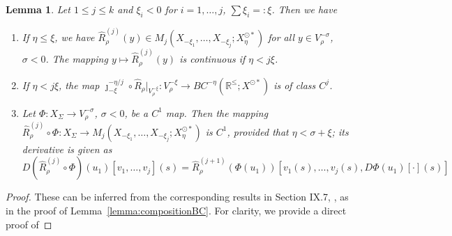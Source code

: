 \documentclass[a4paper, 12pt, oneside, reqno, notitlepage]{amsart}
\theoremstyle{plain}
\newtheorem{lemma}[theorem]{Lemma}
\theoremstyle{definition}
\theoremstyle{remark}
\begin{document}
\begin{lemma}\label{lemma:wideR} 
    Let $1 \leq j \leq k$ and $\xi_i < 0$ for $i =1,\ldots,j$, $\sum \xi_i = : \xi$. 
    Then we have
    \begin{enumerate}[label=\upshape{(\roman*)}]
        \item \label{wideR1} If $\eta \leq  \xi $, we have $\widehat{R}_\rho^{(j)}(y) \in M_j(X_{-\xi_1},\ldots,X_{-\xi_j};X^{\odot *}_{\eta})$ for all $y \in V^{-\sigma}_\rho$, $\sigma < 0$. The mapping $y \mapsto \widehat{R}_\rho^{(j)}(y)$ is continuous if $\eta < j \xi$.
        \item \label{wideR2} If $\eta < j \xi$, the map $\jmath_{-\xi}^{-\eta/j} \circ \widehat{R}_\rho|_{V_\rho^{-\xi}}: V_\rho^{-\xi} \to BC^{-\eta}(\mathbb{R}^{\leq};X^{\odot *})$ is of class $C^j$.
        \item \label{wideR3} Let $\Phi:X_\Sigma \to V_\rho^{-\sigma}$, $\sigma < 0$, be a $C^1$ map. Then the mapping $\widehat{R}_\rho^{(j)} \circ \Phi:X_\Sigma \to M_j(X_{-\xi_1},\ldots,X_{-\xi_j};X^{\odot *}_{\eta})$ is $C^1$, provided that $\eta < \sigma +  \xi$; its derivative is given as
        \begin{equation}
            D (\widehat{R}_\rho^{(j)} \circ \Phi)(u_1) [v_1,\ldots,v_j] (s)=  \widehat{R}_\rho^{(j+1)}(\Phi(u_1))[ v_1(s),\ldots,v_j(s),D\Phi(u_1) [\cdot ](s)]
            \label{eq:Rhatcompderiv}
        \end{equation}
    \end{enumerate}
\end{lemma}

\begin{proof}
    These can be inferred from the corresponding results in Section IX.7, \cite{diekmann2012delay}, as in the proof of Lemma~\ref{lemma:compositionBC}.
    For clarity, we provide a direct proof of
\end{proof}
\end{document}
